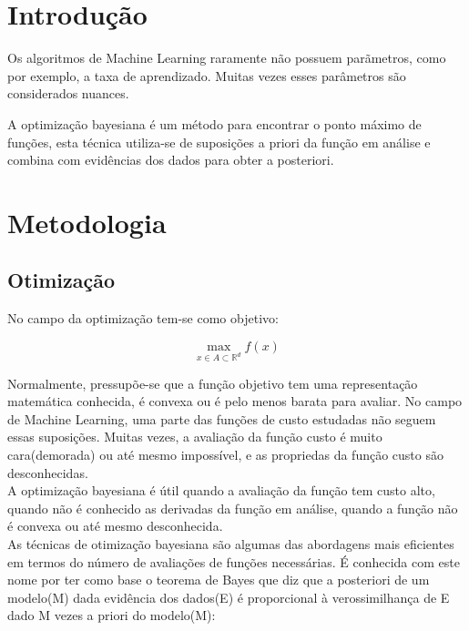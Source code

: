 \documentclass[
	12pt,				%
	twoside,		%
	a4paper,		%
	chapter=TITLE,		   %
	section=TITLE,		   %
	subsection=TITLE,	   %
	subsubsection=TITLE, %
	english,			%
	french,				%
	spanish,			%
	brazil,				%
]{abntex2}
\begin{document}
\tableofcontents*
\cleardoublepage

\textual

\hypertarget{introduuxe7uxe3o}{%
\chapter{Introdução}\label{introduuxe7uxe3o}}

Os algoritmos de Machine Learning raramente não possuem parãmetros, como
por exemplo, a taxa de aprendizado. Muitas vezes esses parâmetros são
considerados nuances.

A optimização bayesiana é um método para encontrar o ponto máximo de
funções, esta técnica utiliza-se de suposições a priori da função em
análise e combina com evidências dos dados para obter a posteriori. ~

\hypertarget{metodologia}{%
\chapter{Metodologia}\label{metodologia}}

\hypertarget{otimizauxe7uxe3o}{%
\section{Otimização}\label{otimizauxe7uxe3o}}

No campo da optimização tem-se como objetivo:

\[
\max\limits_{{x \in A \subset \mathbb{R}^d}} f(x)
\]

Normalmente, pressupõe-se que a função objetivo tem uma representação
matemática conhecida, é convexa ou é pelo menos barata para avaliar. No
campo de Machine Learning, uma parte das funções de custo estudadas não
seguem essas suposições. Muitas vezes, a avaliação da função custo é
muito cara(demorada) ou até mesmo impossível, e as propriedas da função
custo são desconhecidas.\\

A optimização bayesiana é útil quando a avaliação da função tem custo
alto, quando não é conhecido as derivadas da função em análise, quando a
função não é convexa ou até mesmo desconhecida.\\

As técnicas de otimização bayesiana são algumas das abordagens mais
eficientes em termos do número de avaliações de funções necessárias. É
conhecida com este nome por ter como base o teorema de Bayes que diz que
a posteriori de um modelo(M) dada evidência dos dados(E) é proporcional
à verossimilhança de E dado M vezes a priori do modelo(M):
\end{document}
